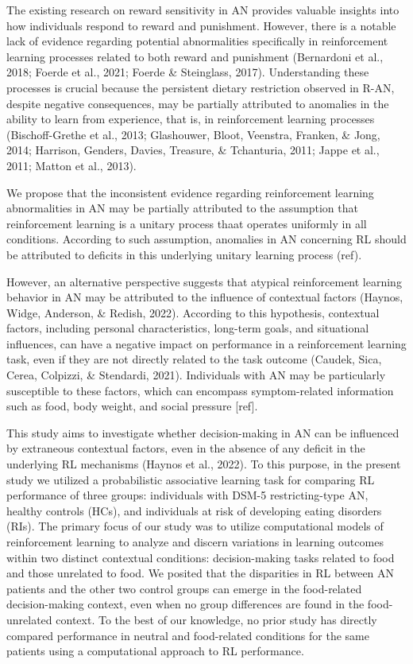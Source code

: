 \documentclass[
  man,floatsintext]{apa6}
\begin{document}
The existing research on reward sensitivity in AN provides valuable insights into how individuals respond to reward and punishment. However, there is a notable lack of evidence regarding potential abnormalities specifically in reinforcement learning processes related to both reward and punishment (Bernardoni et al., 2018; Foerde et al., 2021; Foerde \& Steinglass, 2017). Understanding these processes is crucial because the persistent dietary restriction observed in R-AN, despite negative consequences, may be partially attributed to anomalies in the ability to learn from experience, that is, in reinforcement learning processes (Bischoff-Grethe et al., 2013; Glashouwer, Bloot, Veenstra, Franken, \& Jong, 2014; Harrison, Genders, Davies, Treasure, \& Tchanturia, 2011; Jappe et al., 2011; Matton et al., 2013).

We propose that the inconsistent evidence regarding reinforcement learning abnormalities in AN may be partially attributed to the assumption that reinforcement learning is a unitary process thaat operates uniformly in all conditions. According to such assumption, anomalies in AN concerning RL should be attributed to deficits in this underlying unitary learning process (ref).

However, an alternative perspective suggests that atypical reinforcement learning behavior in AN may be attributed to the influence of contextual factors (Haynos, Widge, Anderson, \& Redish, 2022). According to this hypothesis, contextual factors, including personal characteristics, long-term goals, and situational influences, can have a negative impact on performance in a reinforcement learning task, even if they are not directly related to the task outcome (Caudek, Sica, Cerea, Colpizzi, \& Stendardi, 2021). Individuals with AN may be particularly susceptible to these factors, which can encompass symptom-related information such as food, body weight, and social pressure {[}ref{]}.

This study aims to investigate whether decision-making in AN can be influenced by extraneous contextual factors, even in the absence of any deficit in the underlying RL mechanisms (Haynos et al., 2022). To this purpose, in the present study we utilized a probabilistic associative learning task for comparing RL performance of three groups: individuals with DSM-5 restricting-type AN, healthy controls (HCs), and individuals at risk of developing eating disorders (RIs). The primary focus of our study was to utilize computational models of reinforcement learning to analyze and discern variations in learning outcomes within two distinct contextual conditions: decision-making tasks related to food and those unrelated to food. We posited that the disparities in RL between AN patients and the other two control groups can emerge in the food-related decision-making context, even when no group differences are found in the food-unrelated context. To the best of our knowledge, no prior study has directly compared performance in neutral and food-related conditions for the same patients using a computational approach to RL performance.
\end{document}
